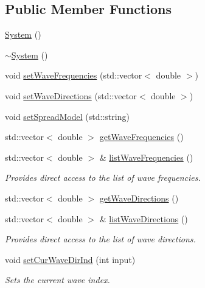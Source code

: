 \subsection*{Public Member Functions}
\begin{DoxyCompactItemize}
\item 
\hyperlink{classosea_1_1ofreq_1_1_system_ae317936c9bcf1374d61745572e0f2f8a}{System} ()
\item 
\hyperlink{classosea_1_1ofreq_1_1_system_a3be70bb338e3f062f821173fd15680d0}{$\sim$\-System} ()
\item 
void \hyperlink{classosea_1_1ofreq_1_1_system_ac044fdc41aa436151bea0c81c8f70bc1}{set\-Wave\-Frequencies} (std\-::vector$<$ double $>$)
\item 
void \hyperlink{classosea_1_1ofreq_1_1_system_a246decc05b383e47fba6d42318cf64ef}{set\-Wave\-Directions} (std\-::vector$<$ double $>$)
\item 
void \hyperlink{classosea_1_1ofreq_1_1_system_abeb34bbe60c3f1490352695839b513f5}{set\-Spread\-Model} (std\-::string)
\item 
std\-::vector$<$ double $>$ \hyperlink{classosea_1_1ofreq_1_1_system_a18b18022b6468a41dfdbfc49c881b933}{get\-Wave\-Frequencies} ()
\item 
std\-::vector$<$ double $>$ \& \hyperlink{classosea_1_1ofreq_1_1_system_a02a78c7751da784608be2dc2afbb4022}{list\-Wave\-Frequencies} ()
\begin{DoxyCompactList}\small\item\em Provides direct access to the list of wave frequencies. \end{DoxyCompactList}\item 
std\-::vector$<$ double $>$ \hyperlink{classosea_1_1ofreq_1_1_system_a8e1d633a4b604223236e4cc4de35bd70}{get\-Wave\-Directions} ()
\item 
std\-::vector$<$ double $>$ \& \hyperlink{classosea_1_1ofreq_1_1_system_a18cbe26b239cf4ee83210ac6679f773f}{list\-Wave\-Directions} ()
\begin{DoxyCompactList}\small\item\em Provides direct access to the list of wave directions. \end{DoxyCompactList}\item 
void \hyperlink{classosea_1_1ofreq_1_1_system_a1bdee1bedde63db2d813fda1036f8299}{set\-Cur\-Wave\-Dir\-Ind} (int input)
\begin{DoxyCompactList}\small\item\em Sets the current wave index. \end{DoxyCompactList}\item 

\end{DoxyCompactItemize}
